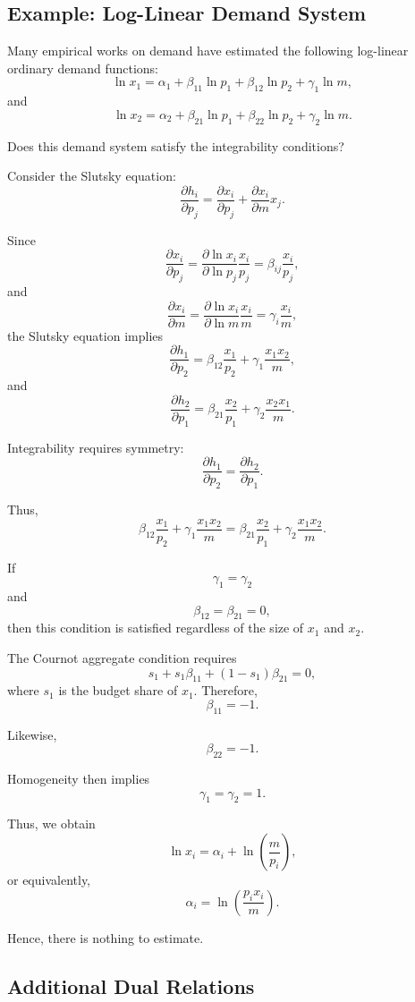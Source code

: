 \subsection{Example: Log-Linear Demand System}

Many empirical works on demand have estimated the following log-linear ordinary demand functions:
\[
\ln x_1
=
\alpha_1
+
\beta_{11}\ln p_1
+
\beta_{12}\ln p_2
+
\gamma_1\ln m,
\]
and
\[
\ln x_2
=
\alpha_2
+
\beta_{21}\ln p_1
+
\beta_{22}\ln p_2
+
\gamma_2\ln m.
\]

Does this demand system satisfy the integrability conditions?

Consider the Slutsky equation:
\[
\frac{\partial h_i}{\partial p_j}
=
\frac{\partial x_i}{\partial p_j}
+
\frac{\partial x_i}{\partial m}x_j.
\]

Since
\[
\frac{\partial x_i}{\partial p_j}
=
\frac{\partial \ln x_i}{\partial \ln p_j}
\frac{x_i}{p_j}
=
\beta_{ij}\frac{x_i}{p_j},
\]
and
\[
\frac{\partial x_i}{\partial m}
=
\frac{\partial \ln x_i}{\partial \ln m}
\frac{x_i}{m}
=
\gamma_i\frac{x_i}{m},
\]
the Slutsky equation implies
\[
\frac{\partial h_1}{\partial p_2}
=
\beta_{12}\frac{x_1}{p_2}
+
\gamma_1\frac{x_1x_2}{m},
\]
and
\[
\frac{\partial h_2}{\partial p_1}
=
\beta_{21}\frac{x_2}{p_1}
+
\gamma_2\frac{x_2x_1}{m}.
\]

Integrability requires symmetry:
\[
\frac{\partial h_1}{\partial p_2}
=
\frac{\partial h_2}{\partial p_1}.
\]

Thus,
\[
\beta_{12}\frac{x_1}{p_2}
+
\gamma_1\frac{x_1x_2}{m}
=
\beta_{21}\frac{x_2}{p_1}
+
\gamma_2\frac{x_1x_2}{m}.
\]

If
\[
\gamma_1=\gamma_2
\]
and
\[
\beta_{12}=\beta_{21}=0,
\]
then this condition is satisfied regardless of the size of \(x_1\) and \(x_2\).

The Cournot aggregate condition requires
\[
s_1+s_1\beta_{11}+(1-s_1)\beta_{21}=0,
\]
where \(s_1\) is the budget share of \(x_1\). Therefore,
\[
\beta_{11}=-1.
\]

Likewise,
\[
\beta_{22}=-1.
\]

Homogeneity then implies
\[
\gamma_1=\gamma_2=1.
\]

Thus, we obtain
\[
\ln x_i
=
\alpha_i+\ln\left(\frac{m}{p_i}\right),
\]
or equivalently,
\[
\alpha_i
=
\ln\left(\frac{p_ix_i}{m}\right).
\]

Hence, there is nothing to estimate.




\subsection{Additional Dual Relations}

